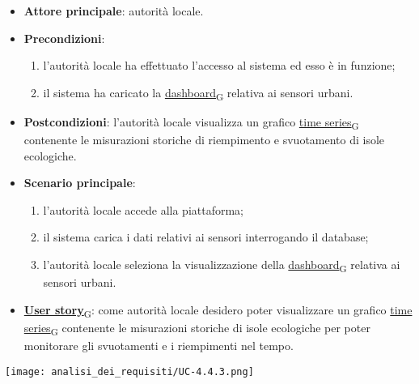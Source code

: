 \newpage
{}
\begin{itemize}
	\item \textbf{Attore principale}: autorità locale.
	\item \textbf{Precondizioni}:
	      \begin{enumerate}
		      \item l'autorità locale ha effettuato l'accesso al sistema ed esso è in funzione;
		      \item il sistema ha caricato la \href{https://7last.github.io/docs/pb/documentazione-interna/glossario\#dashboard}{dashboard\textsubscript{G}} relativa ai sensori urbani.
	      \end{enumerate}
	\item \textbf{Postcondizioni}: l'autorità locale visualizza un grafico \href{https://7last.github.io/docs/pb/documentazione-interna/glossario\#time-series}{time series\textsubscript{G}} contenente le misurazioni storiche di riempimento e svuotamento
	      di isole ecologiche.
	\item \textbf{Scenario principale}:
	      \begin{enumerate}
		      \item l'autorità locale accede alla piattaforma;
		      \item il sistema carica i dati relativi ai sensori interrogando il database;
		      \item l'autorità locale seleziona la visualizzazione della \href{https://7last.github.io/docs/pb/documentazione-interna/glossario\#dashboard}{dashboard\textsubscript{G}} relativa ai sensori urbani.
	      \end{enumerate}
	\item \href{https://7last.github.io/docs/pb/documentazione-interna/glossario\#user-story}{\textbf{User story}\textsubscript{G}}:
	      come autorità locale desidero poter visualizzare un grafico \href{https://7last.github.io/docs/pb/documentazione-interna/glossario\#time-series}{time series\textsubscript{G}} contenente le misurazioni storiche
	      di isole ecologiche per poter monitorare gli svuotamenti e i riempimenti nel tempo.
\end{itemize}
\begin{center}
	\texttt{[image: analisi\_dei\_requisiti/UC-4.4.3.png]}
\end{center}

